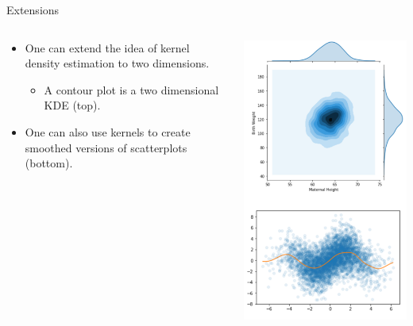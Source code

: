 \documentclass[aspectratio=169]{../latex_main/tntbeamer}  %
\begin{document}
	\begin{frame}{Extensions}
	
	  \begin{columns}
	   \begin{column}{.5\textwidth}
	   
	    \begin{itemize}
	        \item One can extend the idea of kernel density estimation to two dimensions.
	        \begin{itemize}
	            \item A contour plot is a two dimensional KDE (top).
	        \end{itemize}
	        
	        \vspace{3em}
	        \item One can also use kernels to create smoothed versions of scatterplots (bottom).

	    \end{itemize}
	    
	    \end{column} 
	    
	    \begin{column}{.5\textwidth}
	    
	               \centering
	               \includegraphics[scale=.35]{Bild93}

	    \end{column}
	    
	   \end{columns}
	\end{frame}
\end{document}
